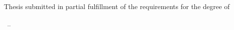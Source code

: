 
\begin{titlepage}

\begin{addmargin}[-1cm]{-3cm}
\begin{center}
\large

\hfill
\vfill

\begingroup
\color{Maroon}\spacedallcaps{\myTitle} \\ \medskip %
\emph{\mySubtitle} \\ \bigskip %
\endgroup

\spacedlowsmallcaps{\myName} %

\vfill


Thesis submitted in partial fulfillment of the requirements for the degree of\\
\myDegree \\

\myTime\ -- \myVersion %

\vfill

\end{center}
\end{addmargin}

\end{titlepage}
